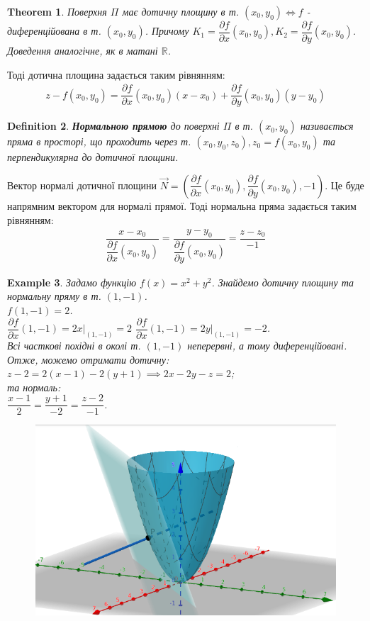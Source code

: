 \documentclass[a4paper, 10pt]{article}
\def\departial#1#2{\dfrac{\partial {#1}}{\partial {#2}}}
\theoremstyle{theoremdd}
\newtheorem{theorem}{Theorem}[subsection]
\theoremstyle{theoremdd}
\newtheorem{definition}[theorem]{Definition}
\theoremstyle{theoremdd}
\theoremstyle{theoremdd}
\newtheorem{example}[theorem]{Example}
\theoremstyle{theoremdd}
\theoremstyle{theoremdd}
\theoremstyle{theoremdd}
\theoremstyle{theoremdd}
\begin{document}
\begin{theorem}
Поверхня $\Pi$ має дотичну площину в т. $(x_0,y_0) \iff f$ - диференційована в т. $(x_0,y_0)$. Причому $K_1 = \departial{f}{x}(x_0,y_0),K_2 = \departial{f}{y}(x_0,y_0)$.\\
\textit{Доведення аналогічне, як в матані $\mathbb{R}$.}
\end{theorem}

Тоді дотична площина задається таким рівнянням:
\begin{align*}
z - f(x_0,y_0) = \departial{f}{x}(x_0,y_0) (x-x_0) + \departial{f}{y}(x_0,y_0) (y-y_0)
\end{align*}

\begin{definition}
\textbf{Нормальною прямою} до поверхні $\Pi$ в т. $(x_0,y_0)$ називається пряма в просторі, що проходить через т. $(x_0,y_0,z_0), z_0 = f(x_0,y_0)$ та перпендикулярна до дотичної площини.
\end{definition}

Вектор нормалі дотичної площини $\vec{N} = \left( \departial{f}{x}(x_0,y_0), \departial{f}{y}(x_0,y_0), -1 \right)$. Це буде напрямним вектором для нормалі прямої. Тоді нормальна пряма задається таким рівнянням:
\begin{align*}
\dfrac{x-x_0}{\departial{f}{x}(x_0,y_0)} = \dfrac{y-y_0}{\departial{f}{y}(x_0,y_0)} = \dfrac{z-z_0}{-1}
\end{align*}

\begin{example}
Задамо функцію $f(x) = x^2+y^2$. Знайдемо дотичну площину та нормальну пряму в т. $(1,-1)$.\\
$f(1,-1) = 2$.\\
$\departial{f}{x}(1,-1) = 2x \Big|_{(1,-1)} = 2$ \hspace{1cm} $\departial{f}{x}(1,-1) = 2y \Big|_{(1,-1)} = -2$.\\
Всі часткові похідні в околі т. $(1,-1)$ неперервні, а тому диференційовані. Отже, можемо отримати дотичну:\\
$z - 2 = 2(x-1) -2(y+1) \implies 2x-2y-z=2$;\\
та нормаль:\\
$\dfrac{x-1}{2} = \dfrac{y+1}{-2} = \dfrac{z-2}{-1}$.
\begin{figure}[H]
\centering
\includegraphics[scale=0.4]{tangent_plane.png}
\end{figure}
\end{example}
\end{document}
